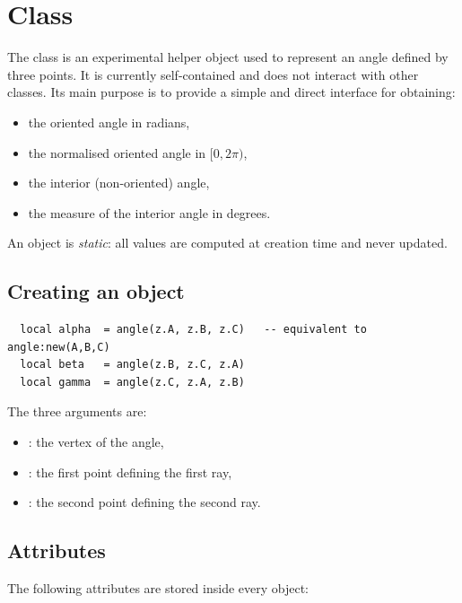 \newpage
\section{Class }
\label{sec:class_angle}

The  class is an experimental helper object used to represent
an angle defined by three points.
It is currently self-contained and does not interact with other classes.
Its main purpose is to provide a simple and direct interface for obtaining:

\begin{itemize}
  \item the oriented angle in radians,
  \item the normalised oriented angle in $[0, 2\pi)$,
  \item the interior (non-oriented) angle,
  \item the measure of the interior angle in degrees.
\end{itemize}

An  object is \emph{static}: all values are computed at creation
time and never updated.

\subsection{Creating an object}
\label{ssub:method_angle_new}

\begin{verbatim}
  local alpha  = angle(z.A, z.B, z.C)   -- equivalent to angle:new(A,B,C)
  local beta   = angle(z.B, z.C, z.A)
  local gamma  = angle(z.C, z.A, z.B)
\end{verbatim}

The three arguments are:
\begin{itemize}
  \item {}: the vertex of the angle,
  \item {}: the first point defining the first ray,
  \item {}: the second point defining the second ray.
\end{itemize}

\subsection{Attributes}

The following attributes are stored inside every  object:

